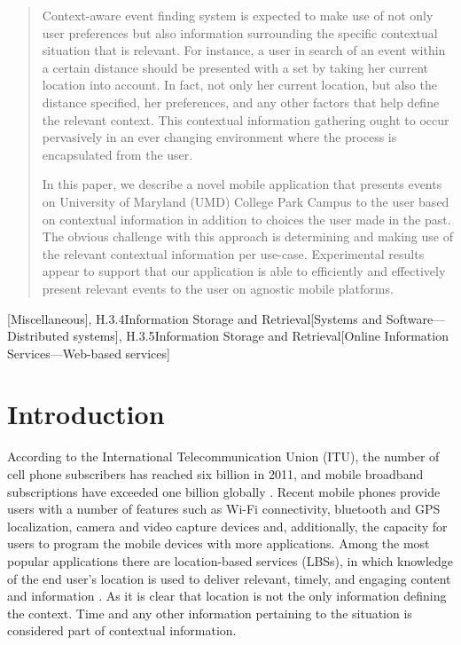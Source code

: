\documentclass{acm_proc_article-sp}
\begin{document}
\date{9 May 2013}


\maketitle
\begin{abstract}
Context-aware event finding system is expected to make use of not only user preferences but also information surrounding the specific contextual situation that is relevant. For instance, a user in search of an event within a certain distance should be presented with a set by taking her current location into account. In fact, not only her current location, but also the distance specified, her preferences, and any other factors that help define the relevant context. This contextual information gathering ought to occur pervasively in an ever changing environment where the process is encapsulated from the user.

In this paper, we describe a novel mobile application that presents events on University of Maryland (UMD) College Park Campus to the user based on contextual information in addition to choices the user made in the past. The obvious challenge with this approach is determining and making use of the relevant contextual information per use-case. Experimental results appear to support that our application is able to efficiently and effectively present relevant events to the user on agnostic mobile platforms.
\end{abstract}

[Miscellaneous], {H.3.4}{Information Storage and Retrieval}[Systems and Software—Distributed systems], {H.3.5}{Information Storage and Retrieval}[Online Information Services—Web-based services]


\section{Introduction}
According to the International Telecommunication Union (ITU), the number of cell phone subscribers has reached six billion in 2011, and mobile broadband subscriptions have exceeded one billion globally \cite{itu:cellphone}. Recent mobile phones provide users with a number of features such as Wi-Fi connectivity, bluetooth and GPS localization, camera and video capture devices and, additionally, the capacity for users to program the mobile devices with more applications. Among the most popular applications there are location-based services (LBSs), in which knowledge of the end user’s location is used to deliver relevant, timely, and engaging content and information \cite{rao:lbs}. As it is clear that location is not the only information defining the context. Time and any other information pertaining to the situation is considered part of contextual information. 
\end{document}
